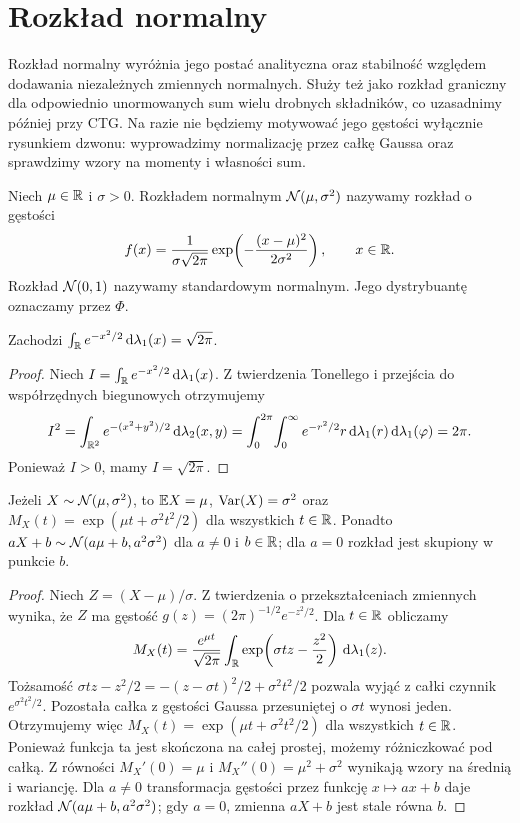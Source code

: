 \section{Rozkład normalny}
Rozkład normalny wyróżnia jego postać analityczna oraz stabilność
względem dodawania niezależnych zmiennych normalnych. Służy też
jako rozkład graniczny dla odpowiednio unormowanych sum
wielu drobnych składników, co uzasadnimy później przy CTG.
Na razie nie będziemy motywować jego gęstości wyłącznie
rysunkiem dzwonu: wyprowadzimy normalizację przez całkę Gaussa
oraz sprawdzimy wzory na momenty i własności sum.

\begin{definicja}
Niech $\mu\in\mathbb{R}$ i $\sigma>0$. Rozkładem normalnym
$\mathcal{N}(\mu,\sigma^2)$ nazywamy rozkład o gęstości
\begin{equation}\label{eq:normal}
f(x)=\frac{1}{\sigma\sqrt{2\pi}}
\exp\!\left(-\frac{(x-\mu)^2}{2\sigma^2}\right),
\qquad x\in\mathbb{R}.
\end{equation}
Rozkład $\mathcal{N}(0,1)$ nazywamy standardowym normalnym.
Jego dystrybuantę oznaczamy przez $\Phi$.
\end{definicja}

\begin{lemat}
Zachodzi $\int_{\mathbb{R}} e^{-x^2/2}\,\mathrm{d}\lambda_1(x)=\sqrt{2\pi}$.
\end{lemat}
\begin{proof}
Niech $I=\int_{\mathbb{R}} e^{-x^2/2}\,\mathrm{d}\lambda_1(x)$.
Z twierdzenia Tonellego i przejścia do współrzędnych biegunowych
otrzymujemy
\[
I^2=\int_{\mathbb{R}^2}e^{-(x^2+y^2)/2}\,\mathrm{d}\lambda_2(x,y)
=\int_0^{2\pi}\!\int_0^\infty e^{-r^2/2}r\,
\mathrm{d}\lambda_1(r)\,\mathrm{d}\lambda_1(\varphi)=2\pi.
\]
Ponieważ $I>0$, mamy $I=\sqrt{2\pi}$.
\end{proof}

\begin{stwierdzenie}
Jeżeli $X\sim\mathcal{N}(\mu,\sigma^2)$, to
$\mathbb{E} X=\mu$, $\operatorname{Var}(X)=\sigma^2$ oraz
$M_X(t)=\exp(\mu t+\sigma^2t^2/2)$ dla wszystkich $t\in\mathbb{R}$.
Ponadto $aX+b\sim\mathcal{N}(a\mu+b,a^2\sigma^2)$
dla $a\ne0$ i $b\in\mathbb{R}$; dla $a=0$ rozkład jest skupiony
w punkcie $b$.
\end{stwierdzenie}
\begin{proof}
Niech $Z=(X-\mu)/\sigma$. Z twierdzenia o
przekształceniach zmiennych wynika, że $Z$ ma gęstość
$g(z)=(2\pi)^{-1/2}e^{-z^2/2}$.
Dla $t\in\mathbb{R}$ obliczamy
\[
M_X(t)=\frac{e^{\mu t}}{\sqrt{2\pi}}\int_{\mathbb{R}}
\exp\!\left(\sigma tz-\frac{z^2}2\right)
\,\mathrm{d}\lambda_1(z).
\]
Tożsamość
$\sigma tz-z^2/2=-(z-\sigma t)^2/2+\sigma^2t^2/2$
pozwala wyjąć z całki czynnik
$e^{\sigma^2t^2/2}$. Pozostała całka z gęstości
Gaussa przesuniętej o $\sigma t$ wynosi jeden.
Otrzymujemy więc
$M_X(t)=\exp(\mu t+\sigma^2t^2/2)$
dla wszystkich $t\in\mathbb{R}$.
Ponieważ funkcja ta jest skończona na całej prostej,
możemy różniczkować pod całką. Z równości
$M_X'(0)=\mu$ i $M_X''(0)=\mu^2+\sigma^2$
wynikają wzory na średnią i wariancję.
Dla $a\ne0$ transformacja gęstości przez funkcję
$x\mapsto ax+b$ daje rozkład
$\mathcal{N}(a\mu+b,a^2\sigma^2)$;
gdy $a=0$, zmienna $aX+b$ jest stale równa $b$.
\end{proof}

